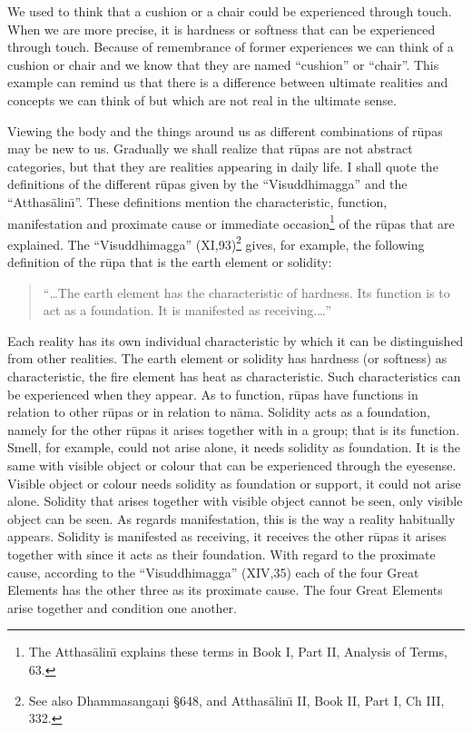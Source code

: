 \documentclass{book}
\begin{document}
We used to think that a cushion or a chair could be experienced through
touch. When we are more precise, it is hardness or softness that can be
experienced through touch. Because of remembrance of former experiences
we can think of a cushion or chair and we know that they are named
``cushion'' or ``chair''. This example can remind us that there is a
difference between ultimate realities and concepts we can think of but
which are not real in the ultimate sense. 

Viewing the body and the things around us as different combinations of
r\=upas may be new to us. Gradually we shall realize that r\=upas are
not abstract categories, but that they are realities appearing in daily
life. I shall quote the definitions of the different r\=upas given by
the ``Visuddhimagga'' and the ``Atthas{\=a}lin\=\i''. These definitions
mention the characteristic, function, manifestation and proximate cause
or immediate occasion\footnote{The Atthas{\=a}lin\=\i{} explains these
terms in Book I, Part II, Analysis of Terms, 63. } of the r\=upas
that are explained. The ``Visuddhimagga'' (XI,93)\footnote{See also
Dhamma\-sanga\d ni {\S}648, and Atthas{\=a}lin\=\i{} II, Book II, Part I, Ch
III, 332.} gives, for example, the following definition of the r\=upa
that is the earth element or solidity:




\begin{quote}\begin{flushleft}
``\ldots The earth element has the characteristic of hardness. Its function
is to act as a foundation. It is manifested as receiving.\ldots''
\end{flushleft}\end{quote}




Each reality has its own individual characteristic by which it can be
distinguished from other realities. The earth element or solidity has
hardness (or softness) as characteristic, the fire element has heat as
characteristic. Such characteristics can be experienced when they
appear. As to function, r\=upas have functions in relation to other
r\=upas or in relation to n{\=a}ma. Solidity acts as a foundation,
namely for the other r\=upas it arises together with in a group; that
is its function. Smell, for example, could not arise alone, it needs
solidity as foundation. It is the same with visible object or colour
that can be experienced through the eyesense. Visible object or colour
needs solidity as foundation or support, it could not arise alone.
Solidity that arises together with visible object cannot be seen, only
visible object can be seen. As regards manifestation, this is the way a
reality habitually appears. Solidity is manifested as receiving, it
receives the other r\=upas it arises together with since it acts as
their foundation. With regard to the proximate cause, according to the
``Visuddhimagga'' (XIV,35) each of the four Great Elements has the
other three as its proximate cause. The four Great Elements arise
together and condition one another. 
\end{document}

